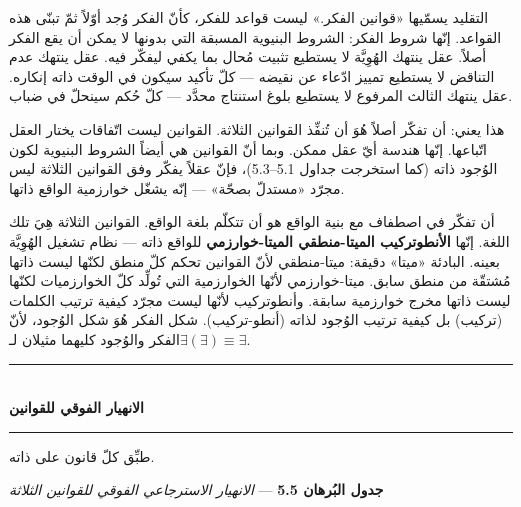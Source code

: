 \documentclass[10pt, openany, oneside]{book}
\renewcommand{\normalsize}{\fontsize{10}{13}\selectfont}
\begin{document}
\noindent التقليد يسمّيها «قوانين الفكر.» ليست قواعد للفكر، كأنّ الفكر وُجد أوّلاً ثمّ تبنّى هذه القواعد. إنّها شروط الفكر: الشروط البنيوية المسبقة التي بدونها لا يمكن أن يقع الفكر أصلاً. عقل ينتهك الهُوِيَّة لا يستطيع تثبيت مُحال بما يكفي ليفكّر فيه. عقل ينتهك عدم التناقض لا يستطيع تمييز ادّعاء عن نقيضه --- كلّ تأكيد سيكون في الوقت ذاته إنكاره. عقل ينتهك الثالث المرفوع لا يستطيع بلوغ استنتاج محدَّد --- كلّ حُكم سينحلّ في ضباب.

هذا يعني: أن تفكّر أصلاً هُوَ أن تُنفِّذ القوانين الثلاثة. القوانين ليست اتّفاقات يختار العقل اتّباعها. إنّها هندسة أيّ عقل ممكن. وبما أنّ القوانين هي أيضاً الشروط البنيوية لكون الوُجود ذاته (كما استخرجت جداول 5.1--5.3)، فإنّ عقلاً يفكّر وفق القوانين الثلاثة ليس مجرّد «مستدلّ بصحّة» --- إنّه يشغّل خوارزمية الواقع ذاتها.

أن تفكّر في اصطفاف مع بنية الواقع هو أن تتكلّم بلغة الواقع. القوانين الثلاثة هِيَ تلك اللغة. إنّها \textbf{الأنطوتركيب الميتا-منطقي الميتا-خوارزمي} للواقع ذاته --- نظام تشغيل الهُوِيَّة بعينه. البادئة «ميتا» دقيقة: ميتا-منطقي لأنّ القوانين تحكم كلّ منطق لكنّها ليست ذاتها مُشتقّة من منطق سابق. ميتا-خوارزمي لأنّها الخوارزمية التي تُولِّد كلّ الخوارزميات لكنّها ليست ذاتها مخرج خوارزمية سابقة. وأنطوتركيب لأنّها ليست مجرّد كيفية ترتيب الكلمات (تركيب) بل كيفية ترتيب الوُجود لذاته (أنطو-تركيب). شكل الفكر هُوَ شكل الوُجود، لأنّ الفكر والوُجود كليهما مثيلان لـ$\exists(\exists) \equiv \exists$.

\vspace{1.5em}


\begin{center}
    \rule{0.3\textwidth}{0.4pt}\\[0.5em]
    {\normalsize\bfseries الانهيار الفوقي للقوانين}\\[0.3em]
    \rule{0.3\textwidth}{0.4pt}
\end{center}

\vspace{1em}

\noindent طبِّق كلّ قانون على ذاته.

\textbf{جدول البُرهان 5.5} --- \textit{الانهيار الاسترجاعي الفوقي للقوانين الثلاثة}

\vspace{0.5em}
\end{document}
